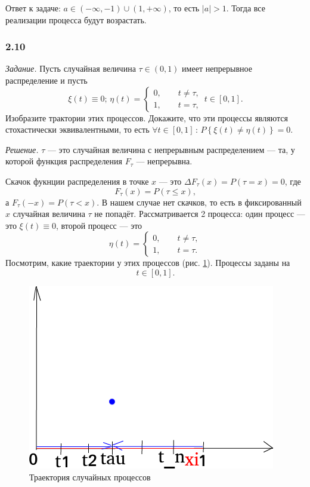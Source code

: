 Ответ к задаче: $a \in \left( - \infty, -1 \right) \cup \left( 1, + \infty \right) $,
то есть $ \left| a \right| > 1$.
Тогда все реализации процесса будут возрастать.

\subsubsection*{2.10}

\textit{Задание.}
Пусть случайная величина $ \tau \in \left( 0, 1 \right) $ имеет непрерывное распределение и пусть
$$ \xi \left( t \right) \equiv 0; \,
  \eta \left( t \right) =
  \begin{cases}
    0, \qquad t \neq \tau, \\
    1, \qquad t = \tau,
  \end{cases} \,
  t \in \left[ 0, 1 \right].$$
Изобразите трактории этих процессов.
Докажите, что эти процессы являются стохастически эквивалентными, то есть
$ \forall t \in \left[ 0, 1 \right] \, : \,
  P \left\{ \xi \left( t \right) \neq \eta \left( t \right) \right\} = 0$.

\textit{Решение.}
$ \tau $ --- это случайная величина с непрерывным распределением --- та,
у которой функция распределения $F_{ \tau }$ --- непрерывна.

Скачок фукнции распределения в точке $x$ ---
это $ \Delta F_{ \tau } \left( x \right) = P \left( \tau = x \right) = 0$,
где
$$F_{ \tau } \left( x \right) = P \left( \tau \leq x \right),$$
а $F_{ \tau } \left( -x \right) = P \left( \tau < x \right) $.
В нашем случае нет скачков, то есть в фиксированный $x$ случайная величина $ \tau $ не попадёт.
Рассматривается 2 процесса: один процесс --- это $ \xi \left( t \right) \equiv 0$,
второй процесс --- это
$$ \eta \left( t \right) =
  \begin{cases}
    0, \qquad t \neq \tau, \\
    1, \qquad t = \tau.
  \end{cases}$$
Посмотрим, какие траектории у этих процессов (рис. \ref{fig:210}).
Процессы заданы на
$$t \in \left[ 0, 1 \right].$$

\begin{figure}[h!]
 \centering
 \includegraphics[width=.5\textwidth]{./pictures/2_10.png}
 \caption{Траектория случайных процессов}
 \label{fig:210}
\end{figure}

